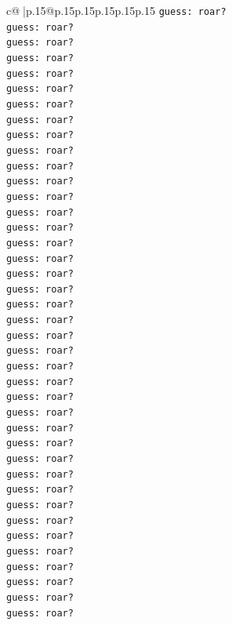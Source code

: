\documentclass{article}
\begin{document}
{\begin{supertabular}{c@{$\;$}|p{.15\linewidth}@{}p{.15\linewidth}p{.15\linewidth}p{.15\linewidth}p{.15\linewidth}p{.15\linewidth}}
{{{\texttt{guess: roar?} \\
\texttt{guess: roar?} \\
\texttt{guess: roar?} \\
\texttt{guess: roar?} \\
\texttt{guess: roar?} \\
\texttt{guess: roar?} \\
\texttt{guess: roar?} \\
\texttt{guess: roar?} \\
\texttt{guess: roar?} \\
\texttt{guess: roar?} \\
\texttt{guess: roar?} \\
\texttt{guess: roar?} \\
\texttt{guess: roar?} \\
\texttt{guess: roar?} \\
\texttt{guess: roar?} \\
\texttt{guess: roar?} \\
\texttt{guess: roar?} \\
\texttt{guess: roar?} \\
\texttt{guess: roar?} \\
\texttt{guess: roar?} \\
\texttt{guess: roar?} \\
\texttt{guess: roar?} \\
\texttt{guess: roar?} \\
\texttt{guess: roar?} \\
\texttt{guess: roar?} \\
\texttt{guess: roar?} \\
\texttt{guess: roar?} \\
\texttt{guess: roar?} \\
\texttt{guess: roar?} \\
\texttt{guess: roar?} \\
\texttt{guess: roar?} \\
\texttt{guess: roar?} \\
\texttt{guess: roar?} \\
\texttt{guess: roar?} \\
\texttt{guess: roar?} \\
\texttt{guess: roar?} \\
\texttt{guess: roar?} \\
\texttt{guess: roar?} \\
\texttt{guess: roar?} \\
\texttt{guess: roar?} \\
}}}
\end{supertabular}}
\end{document}
